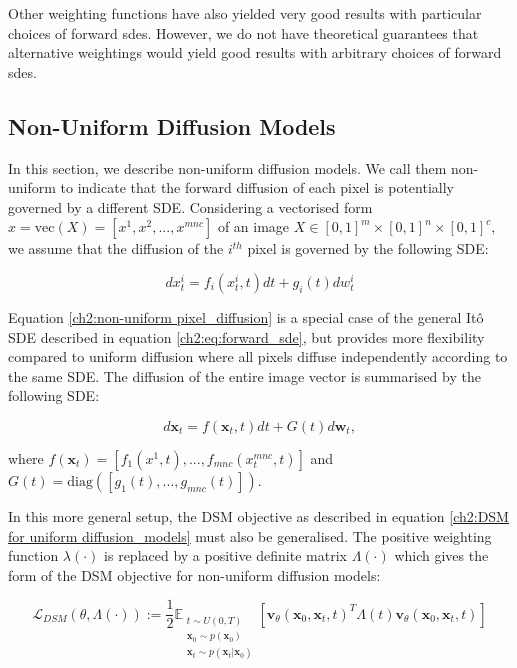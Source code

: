 Other weighting functions have also yielded very good results with particular choices of forward sdes. However, we do not have theoretical guarantees that alternative weightings would yield good results with arbitrary choices of forward sdes.


\subsection{Non-Uniform Diffusion Models}\label{ch2:Non-Uniform Diffusion_Models}
In this section, we describe non-uniform diffusion models. We call them non-uniform to indicate that the forward diffusion of each pixel is potentially governed by a different SDE. Considering a vectorised form $x=\text{vec}(X)=[x^1, x^2,...,x^{mnc}]$ of an image $X\in [0,1]^m\times[0,1]^n\times[0,1]^c$, we assume that the diffusion of the $i^{th}$ pixel is governed by the following SDE:

\begin{equation}\label{ch2:non-uniform pixel_diffusion}
    dx^{i}_t = f_i(x^i_t,t)dt+g_i(t)dw^i_t
\end{equation}

Equation \ref{ch2:non-uniform pixel_diffusion} is a special case of the general It\^{o} SDE described in equation \ref{ch2:eq:forward_sde}, but provides more flexibility compared to uniform diffusion where all pixels diffuse independently according to the same SDE. The diffusion of the entire image vector is summarised by the following SDE:

\begin{equation}\label{ch2:non-uniform image_diffusion}
    d\textbf{x}_t = f(\textbf{x}_t,t)dt+G(t)d\textbf{w}_t,
\end{equation}

\noindent where \(f(\textbf{x}_t)=[f_1(x^1,t),...,f_{mnc}(x^{mnc}_t,t)]\) and \(G(t)=\text{diag}([g_1(t),...,g_{mnc}(t)])\).

In this more general setup, the DSM objective as described in equation \ref{ch2:DSM for uniform diffusion_models} must also be generalised. The positive weighting function $\lambda(\cdot)$ is replaced by a positive definite matrix $\Lambda(\cdot)$ which gives the form of the DSM objective for non-uniform diffusion models:

\begin{equation}
    \label{ch2:DSM for non-uniform diffusion_models}
    \mathcal{L}_{DSM}(\theta, \Lambda(\cdot)) := \frac{1}{2} \mathbb{E}_{\substack{t \sim U(0,T) \\ \mathbf{x}_0 \sim p(\mathbf{x}_0) \\ \mathbf{x}_t \sim p(\mathbf{x}_t | \mathbf{x}_0)}}
    \left[ \mathbf{v}_{\theta}(\mathbf{x}_0, \mathbf{x}_t, t)^T \Lambda(t) \mathbf{v}_{\theta}(\mathbf{x}_0, \mathbf{x}_t, t) \right]
\end{equation}
    

